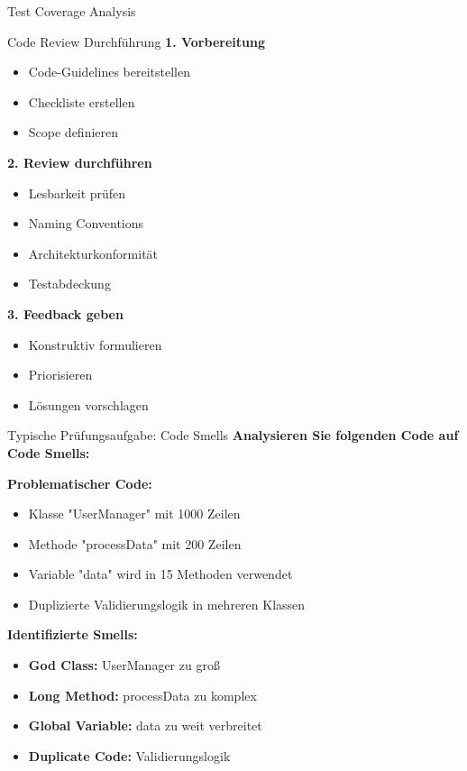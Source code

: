 \begin{example2}{Test Coverage Analysis}
\begin{KR}{Code Review Durchführung}
\textbf{1. Vorbereitung}
\begin{itemize}
    \item Code-Guidelines bereitstellen
    \item Checkliste erstellen
    \item Scope definieren
\end{itemize}

\textbf{2. Review durchführen}
\begin{itemize}
    \item Lesbarkeit prüfen
    \item Naming Conventions
    \item Architekturkonformität
    \item Testabdeckung
\end{itemize}

\textbf{3. Feedback geben}
\begin{itemize}
    \item Konstruktiv formulieren
    \item Priorisieren
    \item Lösungen vorschlagen
\end{itemize}
\end{KR}

\begin{example2}{Typische Prüfungsaufgabe: Code Smells}
\textbf{Analysieren Sie folgenden Code auf Code Smells:}

\textbf{Problematischer Code:}
\begin{itemize}
    \item Klasse "UserManager" mit 1000 Zeilen
    \item Methode "processData" mit 200 Zeilen
    \item Variable "data" wird in 15 Methoden verwendet
    \item Duplizierte Validierungslogik in mehreren Klassen
\end{itemize}

\textbf{Identifizierte Smells:}
\begin{itemize}
    \item \textbf{God Class:} UserManager zu groß
    \item \textbf{Long Method:} processData zu komplex
    \item \textbf{Global Variable:} data zu weit verbreitet
    \item \textbf{Duplicate Code:} Validierungslogik
\end{itemize}


\end{example2}
\end{example2}
